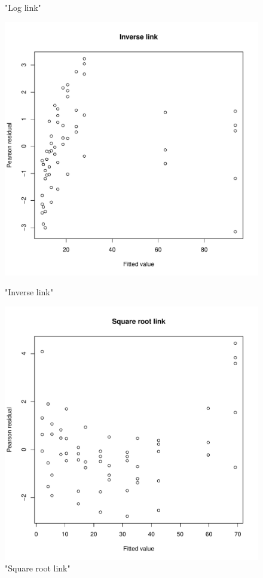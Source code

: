 \documentclass[]{article}
\begin{document}
\begin{enumerate}
{\begin{figure}
	\caption{"Log link"}
	\label{P_res_log}
	\endminipage\hfill
	\includegraphics[width = \textwidth]{pic/HW2_4/p_res_inv}
	\caption{"Inverse link"}
	\label{P_res_inv}
	\endminipage\hfill
	\includegraphics[width = \textwidth]{pic/HW2_4/p_res_squ}
	\caption{"Square root link"}
	\label{P_res_squ}
	\endminipage\hfill
	

\end{figure}}
\end{enumerate}
\end{document}

